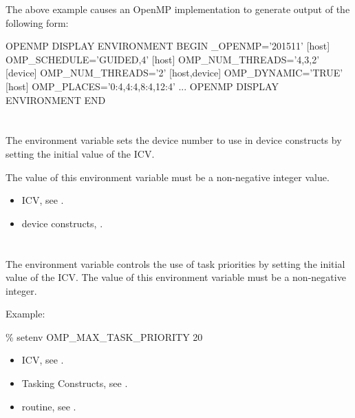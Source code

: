 The above example causes an OpenMP implementation to generate output of the 
following form:

\begin{boxedcode}
OPENMP DISPLAY ENVIRONMENT BEGIN
  \_OPENMP='201511'
  [host] OMP\_SCHEDULE='GUIDED,4'
  [host] OMP\_NUM\_THREADS='4,3,2'
  [device] OMP\_NUM\_THREADS='2'
  [host,device] OMP\_DYNAMIC='TRUE'
  [host] OMP\_PLACES='{0:4},{4:4},{8:4},{12:4}'
  ...
OPENMP DISPLAY ENVIRONMENT END
\end{boxedcode}








\section{}
\label{sec:OMP_DEFAULT_DEVICE}
The  environment variable sets the device number to use in 
device constructs by setting the initial value of the  ICV.

The value of this environment variable must be a non-negative integer value.

\crossreferences
\begin{itemize}
\item {} ICV, see .

\item device constructs, .
\end{itemize}


\section{}
\label{sec:OMP_MAX_TASK_PRIORITY}

The  environment variable controls the use of task
priorities by setting the initial value of the  ICV. The
value of this environment variable must be a non-negative integer. 

Example:
\begin{boxedcode}
\% setenv OMP\_MAX\_TASK\_PRIORITY 20
\end{boxedcode}

\crossreferences
\begin{itemize}
\item {} ICV, see .
\item Tasking Constructs, see .
\item {} routine, see .
\end{itemize}


